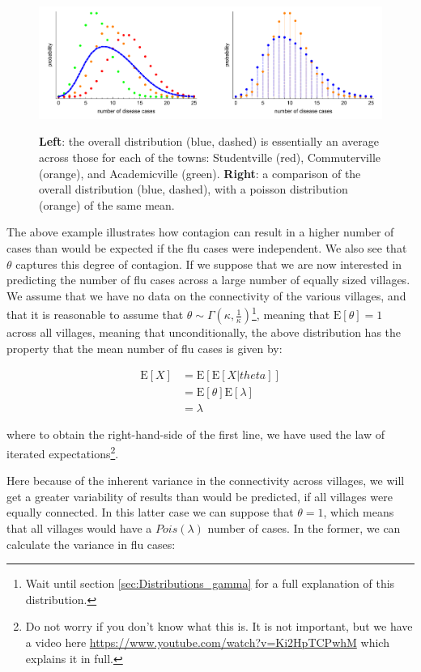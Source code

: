 \documentclass[11pt,fullpage]{book}
\begin{document}
\begin{figure}
\centering
\scalebox{0.5} 
{\includegraphics{Distributions_negativeBinomialDispersion.pdf}}
\caption{\textbf{Left}: the overall distribution (blue, dashed) is essentially an average across those for each of the towns: Studentville (red), Commuterville (orange), and Academicville (green). \textbf{Right}: a comparison of the overall distribution (blue, dashed), with a poisson distribution (orange) of the same mean. }\label{fig:Distributions_negativeBinomialDispersion}
\end{figure}


The above example illustrates how contagion can result in a higher number of cases than would be expected if the flu cases were independent. We also see that $\theta$ captures this degree of contagion. If we suppose that we are now interested in predicting the number of flu cases across a large number of equally sized villages. We assume that we have no data on the connectivity of the various villages, and that it is reasonable to assume that $\theta\sim\Gamma(\kappa,\frac{1}{\kappa})$\footnote{Wait until section \ref{sec:Distributions_gamma} for a full explanation of this distribution.}, meaning that $\mathrm{E}[\theta] = 1$ across all villages, meaning that unconditionally, the above distribution has the property that the mean number of flu cases is given by:

\begin{align}
\mathrm{E}[X] &= \mathrm{E}\left[\mathrm{E}[X|theta]\right]\\
&= \mathrm{E}[\theta]\mathrm{E}[\lambda]\\
&= \lambda
\end{align}

where to obtain the right-hand-side of the first line, we have used the law of iterated expectations\footnote{Do not worry if you don't know what this is. It is not important, but we have a video here \url{https://www.youtube.com/watch?v=Ki2HpTCPwhM} which explains it in full.}. 

Here because of the inherent variance in the connectivity across villages, we will get a greater variability of results than would be predicted, if all villages were equally connected. In this latter case we can suppose that $\theta=1$, which means that all villages would have a $Pois(\lambda)$ number of cases. In the former, we can calculate the variance in flu cases:
\end{document}
